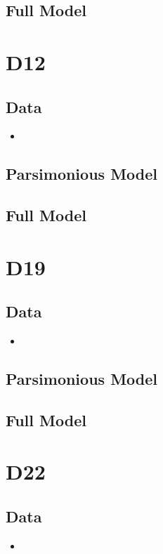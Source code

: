 \documentclass[12pt]{amsart}
\begin{document}
\subsection{Full Model}

\section{D12}
\subsection{Data}
\begin{itemize}
\item
\end{itemize}
\subsection{Parsimonious Model}

\subsection{Full Model}

\section{D19}
\subsection{Data}
\begin{itemize}
\item
\end{itemize}
\subsection{Parsimonious Model}

\subsection{Full Model}

\section{D22}
\subsection{Data}
\begin{itemize}
\item
\end{itemize}
\end{document}
